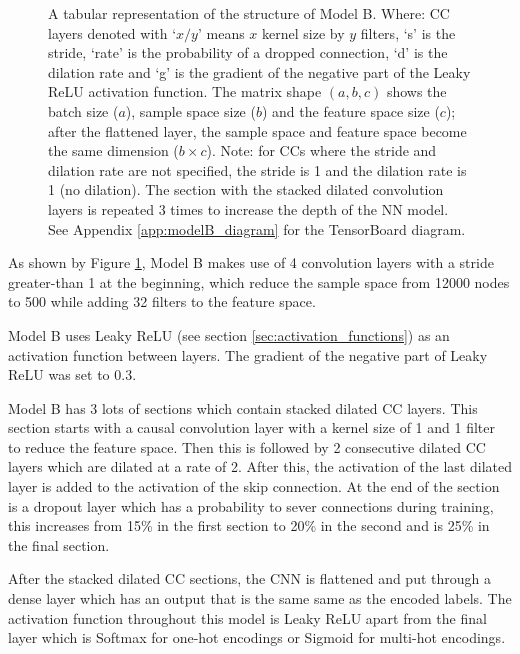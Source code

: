 \documentclass[12pt]{article}
\begin{document}
\begin{figure}[H]
\begin{scriptsize}
\begin{tabular}{l|l|l|l|l|l|l|l|l|}
                \bottomrule
            \end{tabular}
        \end{scriptsize}
        \caption{\footnotesize{A tabular representation of the structure of Model B. Where: CC layers denoted with `$x/y$' means $x$ kernel size by $y$ filters, `s' is the stride, `rate' is the probability of a dropped connection, `d' is the dilation rate and `g' is the gradient of the negative part of the Leaky ReLU activation function. The matrix shape $(a, b, c)$ shows the batch size ($a$), sample space size ($b$) and the feature space size ($c$); after the flattened layer, the sample space and feature space become the same dimension ($b\times c$). Note: for CCs where the stride and dilation rate are not specified, the stride is 1 and the dilation rate is 1 (no dilation). The section with the stacked dilated convolution layers is repeated 3 times to increase the depth of the NN model. See Appendix \ref{app:modelB_diagram} for the TensorBoard diagram.}}
        \label{fig:modelB_structure}
    \end{figure}
    
    As shown by Figure \ref{fig:modelB_structure}, Model B makes use of 4 convolution layers with a stride greater-than 1 at the beginning, which reduce the sample space from 12000 nodes to 500 while adding 32 filters to the feature space.\medskip
    
    Model B uses Leaky ReLU (see section \ref{sec:activation_functions}) as an activation function between layers. The gradient of the negative part of Leaky ReLU was set to 0.3.\medskip
    
    Model B has 3 lots of sections which contain stacked dilated CC layers. This section starts with a causal convolution layer with a kernel size of 1 and 1 filter to reduce the feature space. Then this is followed by 2 consecutive dilated CC layers which are dilated at a rate of 2. After this, the activation of the last dilated layer is added to the activation of the skip connection. At the end of the section is a dropout layer which has a probability to sever connections during training, this increases from 15\% in the first section to 20\% in the second and is 25\% in the final section.\medskip
    
    After the stacked dilated CC sections, the CNN is flattened and put through a dense layer which has an output that is the same same as the encoded labels. The activation function throughout this model is Leaky ReLU apart from the final layer which is Softmax for one-hot encodings or Sigmoid for multi-hot encodings.
    
\end{document}

